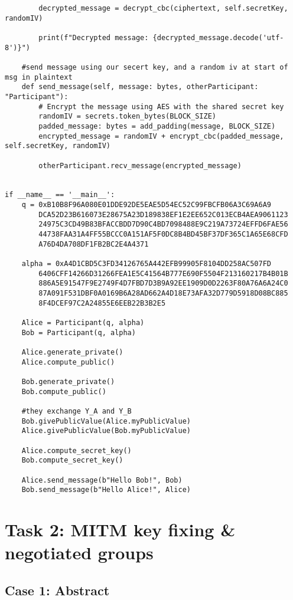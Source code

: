 \documentclass[11pt]{article}
\begin{document}
\begin{lstlisting}
        decrypted_message = decrypt_cbc(ciphertext, self.secretKey, randomIV)

        print(f"Decrypted message: {decrypted_message.decode('utf-8')}")

    #send message using our secert key, and a random iv at start of msg in plaintext
    def send_message(self, message: bytes, otherParticipant: "Participant"):
        # Encrypt the message using AES with the shared secret key
        randomIV = secrets.token_bytes(BLOCK_SIZE)
        padded_message: bytes = add_padding(message, BLOCK_SIZE)
        encrypted_message = randomIV + encrypt_cbc(padded_message, self.secretKey, randomIV)

        otherParticipant.recv_message(encrypted_message)


if __name__ == '__main__':
    q = 0xB10B8F96A080E01DDE92DE5EAE5D54EC52C99FBCFB06A3C69A6A9
		DCA52D23B616073E28675A23D189838EF1E2EE652C013ECB4AEA9061123
		24975C3CD49B83BFACCBDD7D90C4BD7098488E9C219A73724EFFD6FAE56
		44738FAA31A4FF55BCCC0A151AF5F0DC8B4BD45BF37DF365C1A65E68CFD
		A76D4DA708DF1FB2BC2E4A4371

    alpha = 0xA4D1CBD5C3FD34126765A442EFB99905F8104DD258AC507FD
		6406CFF14266D31266FEA1E5C41564B777E690F5504F213160217B4B01B
		886A5E91547F9E2749F4D7FBD7D3B9A92EE1909D0D2263F80A76A6A24C0
		87A091F531DBF0A0169B6A28AD662A4D18E73AFA32D779D5918D08BC885
		8F4DCEF97C2A24855E6EEB22B3B2E5

    Alice = Participant(q, alpha)
    Bob = Participant(q, alpha)

    Alice.generate_private()
    Alice.compute_public()

    Bob.generate_private()
    Bob.compute_public()

    #they exchange Y_A and Y_B
    Bob.givePublicValue(Alice.myPublicValue)
    Alice.givePublicValue(Bob.myPublicValue)

    Alice.compute_secret_key()
    Bob.compute_secret_key()

    Alice.send_message(b"Hello Bob!", Bob)
    Bob.send_message(b"Hello Alice!", Alice)
\end{lstlisting}


\section*{Task 2: MITM key fixing \& negotiated groups}

\subsection*{Case 1: Abstract}
\end{document}
